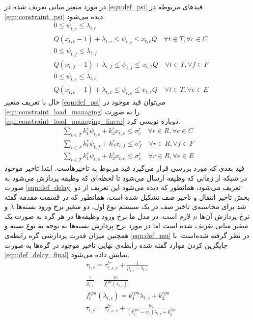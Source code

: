 	در مورد متغیر میانی تعریف شده در \cref{eqn:def_psi} قیدهای مربوطه در \cref{eqn:constraint_psi} دیده می‌شود. 
	\begin{subequations}\label{eqn:constraint_psi}
		\begin{align}
		&0 \leq \psi_{t,c} \leq \lambda_{t,c} \\
		&Q(x_{t,c}-1)+\lambda_{t,c} \leq \psi_{t,c} \leq x_{t,c}Q \quad \forall{t\in T}, \forall{c \in C} \\
		&0 \leq \psi_{t,f} \leq \lambda_{t,f} \\
		&Q(x_{t,f}-1)+\lambda_{t,f} \leq \psi_{t,f} \leq x_{t,f}Q \quad \forall{t \in T}, \forall{f \in F} \\
		&0 \leq \psi_{t,e} \leq \lambda_{t,e} \\
		&Q(x_{t,e}-1)+\lambda_{t,e} \leq \psi_{t,e} \leq x_{t,e}Q \quad \forall{t \in T}, \forall{e \in E}
		\end{align}
	\end{subequations}
	حال با تعریف متغیر \cref{eqn:def_psi} می‌توان قید موجود در \cref{eqn:constraint_load_managing} را به صورت \cref{eqn:constraint_load_managing_linear} دوباره نویسی کرد. 
	\begin{subequations}\label{eqn:constraint_load_managing_linear}
		\begin{align}
		\sum_{t \in T}k_1^r\psi_{t,c}+k_2^rx_{t,c} \le \sigma_c^r \quad \forall{r \in R}, \forall{c \in C} \\
		\sum_{t \in T}k_1^r\psi_{t,f}+k_2^rx_{t,f} \le \sigma_f^r \quad \forall{r \in R}, \forall{f \in F} \\
		\sum_{t \in T}k_1^r\psi_{t,e}+k_2^rx_{t,e} \le \sigma_e^r \quad \forall{r \in R}, \forall{e \in E}
		\end{align}
	\end{subequations}
	قید بعدی که مورد بررسی قرار می‌گیرد قید مربوط به تاخیرهاست. ابتدا تاخیر موجود در شبکه از زمانی که وظیفه ارسال می‌شود تا لحظه‌ای که وظیفه پردازش می‌شود به صورت \cref{eqn:def_delay} تعریف می‌شود، همانطور که دیده می‌شود این تعریف از دو بخش تاخیر انتقال و تاخیر صف تشکیل شده است. 
همانطور که در قسمت مقدمه گفته شد برای محاسبه‌ی تاخیر صف در یک سیستم نوع اول، دو متغیر نرخ ورود بسته‌ها $\lambda$ و نرخ پردازش آن‌ها $\mu$ لازم است. در مدل ما نرخ ورود وظیفه‌ها در هر گره به صورت یک متغیر میانی تغریف شده است اما در مورد نرخ پردازش بسته‌ها به توجه به نوع بسته و همچنین میزان قدرت پردازشی گره رابطه‌ی \cref{eqn:def_mu} در نظر گرفته شده‌است. با جایگزین کردن موارد گفته شده رابطه‌ی نهایی تاخیر موجود در گره‌ها به صورت \cref{eqn:def_delay_final} نمایش داده می‌شود. 
	\begin{subequations}
		\begin{align}
			&\tau_{t,c} = \tau_{t,s,c}^{tr} + \frac{1}{\mu_{t,c}-\lambda_{t,c}} \label{eqn:def_delay}\\
			&\frac{1}{\mu_{t,c}} = \frac{w_t}{f_t^{cpu}(\lambda_{t,c})} \label{eqn:def_mu}\\
			&f_t^{cpu}(\lambda_{t,c}) = k_1^{cpu}\lambda_{t,c}+k_2^{cpu} \\
			&\tau_{t,c} = \tau_{t,s,c}^{tr} + \frac{w_t}{(k_1^{cpu}-w_t)\lambda_{t,c} + k_2^{cpu}} \label{eqn:def_delay_final}
		\end{align}
	\end{subequations}
